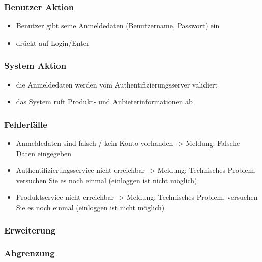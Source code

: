 \documentclass[a4paper,12pt]{article}
\begin{document}
\subsubsection{Benutzer Aktion}\label{benutzer-aktion}

\begin{itemize}
\item
  Benutzer gibt seine Anmeldedaten (Benutzername, Passwort) ein
\item
  drückt auf Login/Enter
\end{itemize}

\subsubsection{System Aktion}\label{system-aktion}

\begin{itemize}
\item
  die Anmeldedaten werden vom Authentifizierungsserver validiert
\item
  das System ruft Produkt- und Anbieterinformationen ab
\end{itemize}

\subsubsection{Fehlerfälle}\label{fehlerfalle}

\begin{itemize}
\item
  Anmeldedaten sind falsch / kein Konto vorhanden -\textgreater{}
  Meldung: Falsche Daten eingegeben
\item
  Authentifizierungsservice nicht erreichbar -\textgreater{} Meldung:
  Technisches Problem, versuchen Sie es noch einmal (einloggen ist nicht
  möglich)
\item
  Produktservice nicht erreichbar -\textgreater{} Meldung: Technisches
  Problem, versuchen Sie es noch einmal (einloggen ist nicht möglich)
\end{itemize}

\subsubsection{Erweiterung}\label{erweiterung}

\subsubsection{Abgrenzung}\label{abgrenzung}
\end{document}
